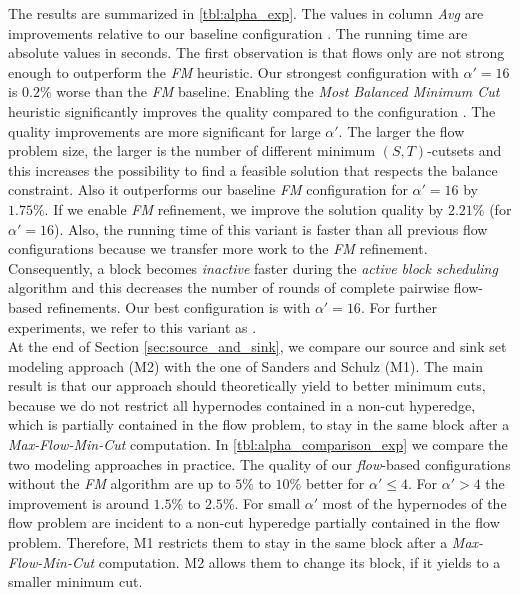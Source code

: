 The results are summarized in \autoref{tbl:alpha_exp}. The values
in column \emph{Avg} are improvements
relative to our baseline configuration \FlowVariant{-}{-}{+}. The running
time are absolute values in seconds. The first observation is that flows
only are not strong enough to outperform the
\emph{FM} heuristic. Our strongest configuration with $\alpha' = 16$
is $0.2\%$ worse than the \emph{FM} baseline. 
Enabling the \emph{Most Balanced Minimum Cut} heuristic significantly improves the
quality compared to the configuration \FlowVariant{+}{-}{-}.
The quality improvements are more significant for large
$\alpha'$. The larger the flow problem size, the larger is the number of different minimum 
$(S,T)$-cutsets and this increases the possibility to find a feasible solution that respects the 
balance constraint. Also it outperforms our baseline \emph{FM} 
configuration for $\alpha' = 16$ by $1.75\%$.
If we enable \emph{FM} refinement, we improve the solution
quality by $2.21\%$ (for $\alpha' = 16$). Also, the running time of this variant is faster
than all previous flow configurations because we transfer more work to the \emph{FM} refinement.
Consequently, a block becomes \emph{inactive} faster during the \emph{active block 
scheduling} algorithm and this decreases the number of rounds of complete pairwise 
flow-based refinements. 
Our best configuration is \FlowVariant{+}{+}{+} with $\alpha' = 16$. 
For further experiments, we refer to this variant as . \\
At the end of Section \ref{sec:source_and_sink}, we compare our source and sink set modeling
approach (\textsc{M2}) with the one of Sanders and Schulz \cite{sanders2011engineering} (\textsc{M1}). The main result is
that our approach should theoretically yield to better minimum cuts, because we do not restrict
all hypernodes contained in a non-cut hyperedge, which is partially contained in the flow problem,
to stay in the same block after a \emph{Max-Flow-Min-Cut} computation. In \autoref{tbl:alpha_comparison_exp}
we compare the two modeling approaches in practice. The quality of our \emph{flow}-based
configurations without the \emph{FM} algorithm are up to $5\%$ to $10\%$ better for 
$\alpha' \le 4$. For $\alpha' > 4$ the improvement is around $1.5\%$ to $2.5\%$. For small
$\alpha'$ most of the hypernodes of the flow problem are incident to a non-cut hyperedge partially
contained in the flow problem. Therefore, \textsc{M1} restricts them to stay in the same block
after a \emph{Max-Flow-Min-Cut} computation. \textsc{M2} allows them to change its block, if 
it yields to a smaller minimum cut.


